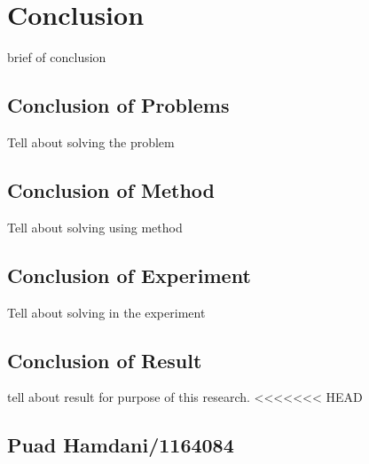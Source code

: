 \chapter{Conclusion}
brief of conclusion

\section{Conclusion of Problems}
Tell about solving the problem

\section{Conclusion of Method}
Tell about solving using method

\section{Conclusion of Experiment}
Tell about solving in the experiment

\section{Conclusion of Result}
tell about result for purpose of this research.
<<<<<<< HEAD
\section{Puad Hamdani/1164084}
